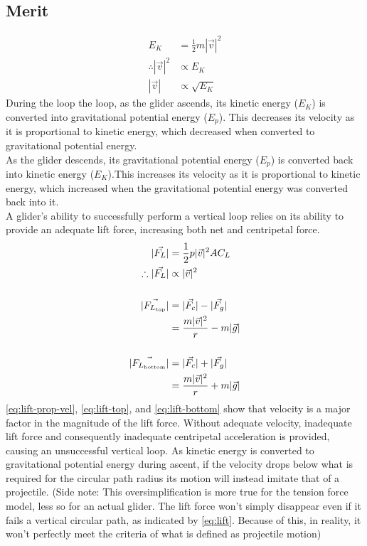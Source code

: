 \documentclass[11pt, a4paper]{article}
\def\ParagraphSpacing{30pt}
\begin{document}
	\subsection{Merit}
	\begin{align}
		E_K&=\frac{1}{2}m|\vec{v}|^2\\
		\therefore |\vec{v}|^2&\propto E_K\\
		|\vec{v}|&\propto \sqrt{E_K}
	\end{align}
	During the loop the loop, as the glider ascends, its kinetic energy ($E_K$) is converted into gravitational potential energy ($E_p$). This decreases its velocity as it is proportional to kinetic energy, which decreased when converted to gravitational potential energy. \\
	As the glider descends, its gravitational potential energy ($E_p$) is converted back into kinetic energy ($E_K$).This increases its velocity as it is proportional to kinetic energy, which increased when the gravitational potential energy was converted back into it.\\[\ParagraphSpacing]
	A glider's ability to successfully perform a vertical loop relies on its ability to provide an adequate lift force, increasing both net and centripetal force.
	\begin{align}
		|\vec{F_L}|&=\frac{1}{2}p|\vec{v}|^2AC_L \label{eq:lift}\\
		\therefore |\vec{F_L}|&\propto |\vec{v}|^2 \label{eq:lift-prop-vel} \\[\baselineskip]
		|\vec{F_{L_\text{top}}}|&=|\vec{F_c}|-|\vec{F_g}|\\
		&=\frac{m|\vec{v}|^2}{r}-m|\vec{g}|\label{eq:lift-top} \\[\baselineskip]
		|\vec{F_{L_\text{bottom}}}|&=|\vec{F_c}|+|\vec{F_g}|\\
		&=\frac{m|\vec{v}|^2}{r}+m|\vec{g}| \label{eq:lift-bottom}
	\end{align}
	\cref{eq:lift-prop-vel}, \cref{eq:lift-top}, and \cref{eq:lift-bottom} show that velocity is a major factor in the magnitude of the lift force. Without adequate velocity, inadequate lift force and consequently inadequate centripetal acceleration is provided, causing an unsuccessful vertical loop. As kinetic energy is converted to gravitational potential energy during ascent, if the velocity drops below what is required for the circular path radius its motion will instead imitate that of a projectile. (Side note: This oversimplification is more true for the tension force model, less so for an actual glider. The lift force won't simply disappear even if it fails a vertical circular path, as indicated by \cref{eq:lift}. Because of this, in reality, it won't perfectly meet the criteria of what is defined as projectile motion)\\
\end{document}
